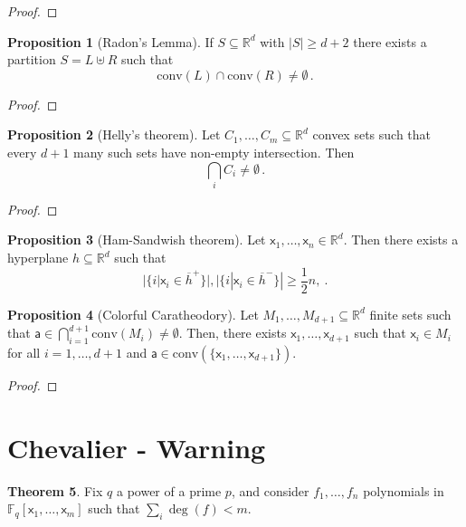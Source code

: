 \documentclass[12pt]{amsart}
\theoremstyle{definition}
\newtheorem{thm}{Theorem}[section]
\newtheorem{prop}[thm]{Proposition}
\newcommand{\R}{\mathbb{R}}
\newcommand{\F}{\mathbb{F}}
\newcommand{\vx}{\mathsf{x}}
\newcommand{\va}{\mathsf{a}}
\newcommand{\conv}{\mathrm{conv}}
\begin{document}
\begin{proof}

\end{proof}



\begin{prop}[Radon's Lemma]
If $S\subseteq \R^d$ with $|S| \geq d+2$ there exists a partition $S = L \uplus R$ such that $$\conv (L) \cap \conv (R) \neq \emptyset \, .$$
\end{prop}


\begin{proof}

\end{proof}


\begin{prop}[Helly's theorem]
Let $C_1, \ldots , C_m \subseteq \R^d$ convex sets such that every $d+1$ many such sets have non-empty intersection.
Then 
$$\bigcap_i C_i \neq \emptyset \, . $$
\end{prop}

\begin{proof}

\end{proof}



\begin{prop}[Ham-Sandwish theorem]
Let $\vx_1 ,  \ldots , \vx_n \in \R^d$.
Then there exists a hyperplane $h \subseteq \R^d$ such that 
$$ |\{i | \vx_i \in \overline{h}^+\}| , |\{i | \vx_i \in \overline{h}^-\}| \geq \frac{1}{2} n,\ . $$
\end{prop}



\begin{prop}[Colorful Caratheodory]
Let $M_1, \ldots, M_{d+1} \subseteq \R^d$ finite sets such that $\va \in \bigcap_{i = 1}^{d+1} \conv (M_i) \neq \emptyset$.
Then, there exists $\vx_1, \dots, \vx_{d+1}$ such that $\vx_i \in M_i$ for all $i = 1, \ldots, d+1$ and $\va \in \conv (\{\vx_1, \ldots, \vx_{d+1}\})$.
\end{prop}

\begin{proof}

\end{proof}

\section{Chevalier - Warning}%

\begin{thm}
Fix $q$ a power of a prime $p$, and consider $f_1, \ldots, f_n$ polynomials in $\F_q[\vx_1, \ldots , \vx_m]$ such that $\sum_i \deg (f) < m$.



\end{thm}
\end{document}
